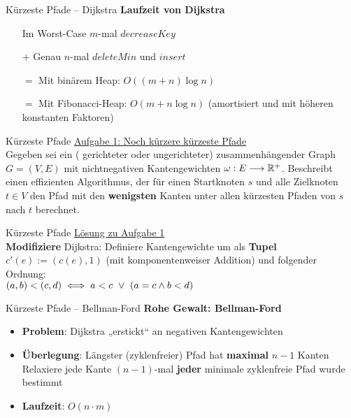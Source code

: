 \begin{frame}{Kürzeste Pfade – Dijkstra}
	\textbf{Laufzeit von Dijkstra} 
	\begin{itemize}
		\item[] Im Worst-Case $m$-mal $decreaseKey$
		\item[$+$] Genau $n$-mal $deleteMin$ und $insert$
		\pause
		\item[$=$] Mit binärem Heap: $O\left((m+n)\log n\right)$
		\pause
		\item[$=$] Mit Fibonacci-Heap: $O(m + n \log n)$ \quad (amortisiert und mit höheren konstanten Faktoren)
	\end{itemize}
\end{frame}

\begin{frame}{Kürzeste Pfade}
	\underline{Aufgabe 1: Noch kürzere kürzeste Pfade} \\
	Gegeben sei ein ( gerichteter oder ungerichteter) zusammenhängender Graph $G = (V, E)$ mit nichtnegativen Kantengewichten $\omega : E \longrightarrow \mathbb{R}^{+}$. Beschreibt einen effizienten Algorithmus, der für einen Startknoten $s$ und alle Zielknoten $t \in V$ den Pfad mit den \textbf{wenigsten} Kanten unter allen kürzesten Pfaden von $s$ nach $t$ berechnet.
\end{frame}

\begin{frame}{Kürzeste Pfade}
	\underline{Lösung zu Aufgabe 1} \\
	\textbf{Modifiziere} Dijkstra: Definiere Kantengewichte um als \textbf{Tupel} $c'(e) := \left(c(e), 1\right)$ (mit komponentenweiser Addition) und folgender Ordnung: \\ $(a, b) < (c, d) \Gdw a < c \ \lor\  (a = c \land b < d)$ 
\end{frame}

\begin{frame}{Kürzeste Pfade – Bellman-Ford}
	\textbf{Rohe Gewalt: Bellman-Ford} 
	\begin{itemize}
		\pause
		\item \textbf{Problem}: Dijkstra „erstickt“ an negativen Kantengewichten
		\pause
		\item \textbf{Überlegung}: Längster (zyklenfreier) Pfad hat \textbf{maximal} $n-1$ Kanten
		\pause
		\implitem Relaxiere jede Kante $(n-1)$-mal \impl \textbf{jeder} minimale zyklenfreie Pfad wurde bestimmt
		\pause
		\item \textbf{Laufzeit}: $O(n \cdot m)$
	\end{itemize}
\end{frame}

